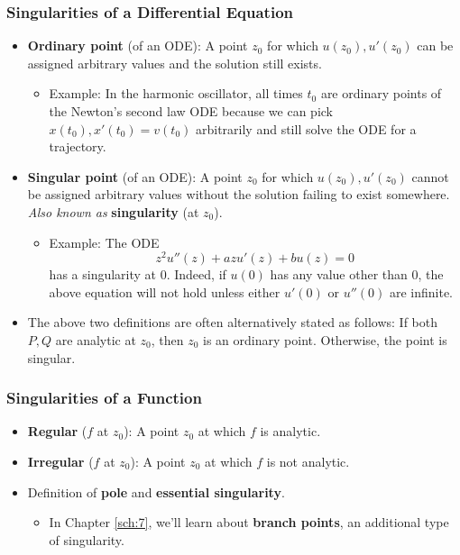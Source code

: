 \documentclass[../finalProject.tex]{subfiles}
\begin{document}
\subsubsection{Singularities of a Differential Equation}
\begin{itemize}
    \item \textbf{Ordinary point} (of an ODE): A point $z_0$ for which $u(z_0),u'(z_0)$ can be assigned arbitrary values and the solution still exists.
    \begin{itemize}
        \item Example: In the harmonic oscillator, all times $t_0$ are ordinary points of the Newton's second law ODE because we can pick $x(t_0),x'(t_0)=v(t_0)$ arbitrarily and still solve the ODE for a trajectory.
    \end{itemize}
    \item \textbf{Singular point} (of an ODE): A point $z_0$ for which $u(z_0),u'(z_0)$ cannot be assigned arbitrary values without the solution failing to exist somewhere. \emph{Also known as} \textbf{singularity} (at $z_0$).
    \begin{itemize}
        \item Example: The ODE
        \begin{equation*}
            z^2u''(z)+azu'(z)+bu(z) = 0
        \end{equation*}
        has a singularity at 0. Indeed, if $u(0)$ has any value other than 0, the above equation will not hold unless either $u'(0)$ or $u''(0)$ are infinite.
    \end{itemize}
    \item The above two definitions are often alternatively stated as follows: If both $P,Q$ are analytic at $z_0$, then $z_0$ is an ordinary point. Otherwise, the point is singular.
\end{itemize}

\subsubsection{Singularities of a Function}
\begin{itemize}
    \item \textbf{Regular} ($f$ at $z_0$): A point $z_0$ at which $f$ is analytic.
    \item \textbf{Irregular} ($f$ at $z_0$): A point $z_0$ at which $f$ is not analytic.
    \item Definition of \textbf{pole} and \textbf{essential singularity}.
    \begin{itemize}
        \item In Chapter \ref{sch:7}, we'll learn about \textbf{branch points}, an additional type of singularity.
    \end{itemize}
\end{itemize}
\end{document}
